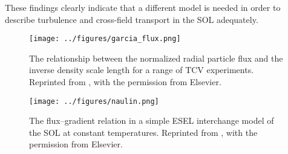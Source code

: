 These findings clearly indicate that a different model is needed in order to describe
turbulence and cross-field transport in the SOL adequately.
\begin{figure}
  \centering
  \begin{minipage}{.48\linewidth}
    \texttt{[image: ../figures/garcia\_flux.png]}
    \caption{The relationship between the normalized radial particle flux and the inverse density scale length for a range of TCV experiments. Reprinted from \cite{garcia2007turbulent}, with the permission from Elsevier.}
    \label{Fig:garcia_flux}
  \end{minipage}
  \hfill
  \begin{minipage}{.48\linewidth}
    \texttt{[image: ../figures/naulin.png]}
    \caption{The ﬂux–gradient relation in a simple ESEL interchange model of the SOL at constant temperatures. Reprinted from \cite{naulin2007turbulent}, with the permission from Elsevier.}
    \label{Fig:naulin}
  \end{minipage}
\end{figure}

